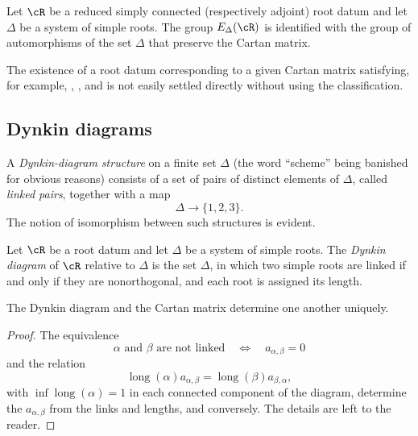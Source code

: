 \begin{corollary}\label{sga3:XXI:7.3.4}
Let \(\cR\) be a reduced simply connected (respectively adjoint)
root datum and let \(\Delta\) be a system of simple roots.  The
group \(E_\Delta(\cR)\) is identified with the group of
automorphisms of the set \(\Delta\) that preserve the Cartan
matrix.
\end{corollary}

\begin{remark}\label{sga3:XXI:7.3.5}
The existence of a root datum corresponding to a given Cartan
matrix satisfying, for example, , , and  is not easily
settled directly without using the classification.
\end{remark}


\subsection{Dynkin diagrams}\label{sga3:XXI:7.4}

\begin{definition}\label{sga3:XXI:7.4.1}
A \emph{Dynkin-diagram structure} on a finite set \(\Delta\)
(the word ``scheme'' being banished for obvious reasons) consists
of a set of pairs of distinct elements of \(\Delta\), called
\emph{linked pairs}, together with a map
\[
 \Delta\longrightarrow\{1,2,3\}.
\]
The notion of isomorphism between such structures is evident.
\end{definition}

\begin{definition}\label{sga3:XXI:7.4.2}
Let \(\cR\) be a root datum and let \(\Delta\) be a system of
simple roots.  The \emph{Dynkin diagram} of \(\cR\) relative to
\(\Delta\) is the set \(\Delta\), in which two simple roots are
linked if and only if they are nonorthogonal, and each root is
assigned its length.
\end{definition}

\begin{proposition}\label{sga3:XXI:7.4.3}
The Dynkin diagram and the Cartan matrix determine one another
uniquely.
\end{proposition}

\begin{proof}
The equivalence
\[
 \alpha\text{ and }\beta\text{ are not linked}
 \quad\Longleftrightarrow\quad
 a_{\alpha,\beta}=0
\]
and the relation
\[
 \operatorname{long}(\alpha)a_{\alpha,\beta}
 =
 \operatorname{long}(\beta)a_{\beta,\alpha},
\]
with \(\inf\operatorname{long}(\alpha)=1\) in each connected
component of the diagram, determine the \(a_{\alpha,\beta}\) from
the links and lengths, and conversely.  The details are left to the
reader.
\end{proof}

